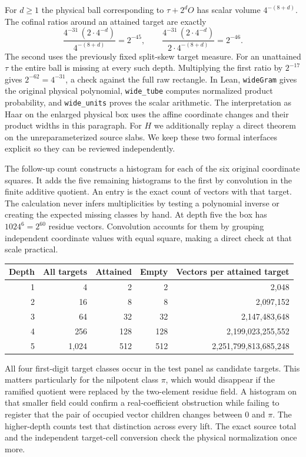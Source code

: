 \documentclass[12pt,letterpaper]{article}
\newcommand{\id}[1]{{\small\nolinkurl{#1}}}
\begin{document}
For $d\ge1$ the physical ball corresponding to $\tau+2^dO$ has scalar volume $4^{-(8+d)}$. The cofinal ratios around an attained target are exactly
\[
 \frac{4^{-31}\,(2\cdot4^{-d})}{4^{-(8+d)}}=2^{-45},
 \qquad
 \frac{4^{-31}\,(2\cdot4^{-d})}{2\cdot4^{-(8+d)}}=2^{-46}.
\]
The second uses the previously fixed split-skew target measure. For an unattained $\tau$ the entire ball is missing at every such depth. Multiplying the first ratio by $2^{-17}$ gives $2^{-62}=4^{-31}$, a check against the full raw rectangle. In Lean, \id{wideGram} gives the original physical polynomial, \id{wide_tube} computes normalized product probability, and \id{wide_units} proves the scalar arithmetic. The interpretation as Haar on the enlarged physical box uses the affine coordinate changes and their product widths in this paragraph. For $H$ we additionally replay a direct theorem on the unreparameterized source slabs. We keep these two formal interfaces explicit so they can be reviewed independently.

The follow-up count constructs a histogram for each of the six original coordinate squares. It adds the five remaining histograms to the first by convolution in the finite additive quotient. An entry is the exact count of vectors with that target. The calculation never infers multiplicities by testing a polynomial inverse or creating the expected missing classes by hand. At depth five the box has $1024^6=2^{60}$ residue vectors. Convolution accounts for them by grouping independent coordinate values with equal square, making a direct check at that scale practical.

\begin{center}\small\begin{tabular}{@{}rrrrr@{}}\toprule
Depth & All targets & Attained & Empty & Vectors per attained target\\\midrule
1 & 4 & 2 & 2 & 2,048\\
2 & 16 & 8 & 8 & 2,097,152\\
3 & 64 & 32 & 32 & 2,147,483,648\\
4 & 256 & 128 & 128 & 2,199,023,255,552\\
5 & 1,024 & 512 & 512 & 2,251,799,813,685,248\\\bottomrule
\end{tabular}\end{center}
All four first-digit target classes occur in the test panel as candidate targets. This matters particularly for the nilpotent class $\pi$, which would disappear if the ramified quotient were replaced by the two-element residue field. A histogram on that smaller field could confirm a real-coefficient obstruction while failing to register that the pair of occupied vector children changes between $0$ and $\pi$. The higher-depth counts test that distinction across every lift. The exact source total and the independent target-cell conversion check the physical normalization once more.
\end{document}
